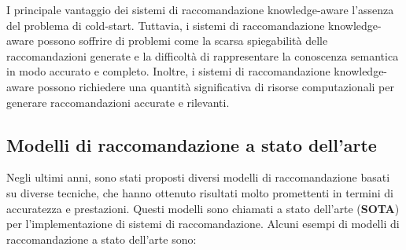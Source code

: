 \noindent I principale vantaggio dei sistemi di raccomandazione knowledge-aware l'assenza del problema di cold-start. Tuttavia, i sistemi di raccomandazione knowledge-aware possono soffrire di problemi come la scarsa spiegabilità delle raccomandazioni generate e la difficoltà di rappresentare la conoscenza semantica in modo accurato e completo. Inoltre, i sistemi di raccomandazione knowledge-aware possono richiedere una quantità significativa di risorse computazionali per generare raccomandazioni accurate e rilevanti.\\

\subsection{Modelli di raccomandazione a stato dell'arte}
Negli ultimi anni, sono stati proposti diversi modelli di raccomandazione basati su diverse tecniche, che hanno ottenuto risultati molto promettenti in termini di accuratezza e prestazioni. Questi modelli sono chiamati a stato dell'arte (\textbf{SOTA}) per l'implementazione di sistemi di raccomandazione. Alcuni esempi di modelli di raccomandazione a stato dell'arte sono:
